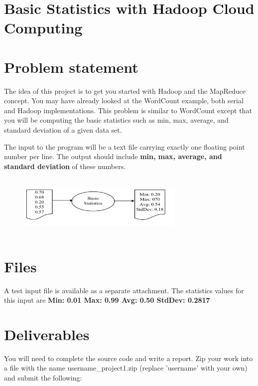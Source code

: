
\section{Basic Statistics with Hadoop Cloud Computing}       

\section*{Problem statement}
 
The idea of this project is to get you started with Hadoop and the MapReduce
concept. You may have already looked at the WordCount example, both serial and
Hadoop implementations. This problem is similar to WordCount except that you
will be computing the basic statistics such as min, max, average, and standard
deviation of a given data set.

The input to the program will be a text file carrying exactly one floating
point number per line. The output should include \textbf{min, max, average, and
standard deviation} of these numbers.

\begin{figure}[!htbp]
\includegraphics[width=8cm,height=3cm]{section/icloud/assignment/problems/project1/p1example.png}
\centering
\end{figure}

\section*{Files}
A test input file is available as a separate attachment.
The statistics values for this input are \textbf{Min: 0.01 Max: 0.99 Avg: 0.50 StdDev: 0.2817}


\section*{Deliverables}
You will need to complete the source code and write a report. Zip your work
into a file with the name username\_project1.zip (replace 'username' with your
own) and submit the following:

